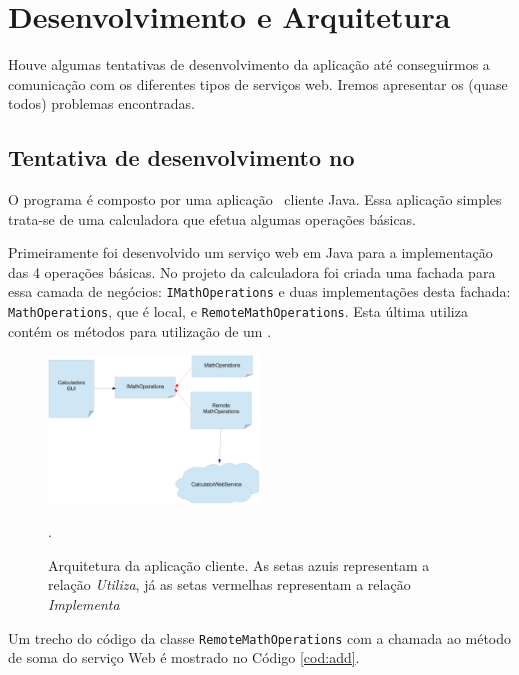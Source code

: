%

\chapter{Desenvolvimento e Arquitetura}

Houve algumas tentativas de desenvolvimento da aplicação até conseguirmos a
comunicação com os diferentes tipos de serviços web. Iremos apresentar os (quase
todos) problemas encontradas.

\section{Tentativa de desenvolvimento no \NetBeans}

O programa é composto por uma aplicação \desktop\ cliente Java. Essa aplicação
simples trata-se de uma calculadora que efetua algumas operações básicas. 

Primeiramente foi desenvolvido um serviço web em Java para a implementação das 4
operações básicas. No projeto da calculadora foi criada uma fachada para essa camada de negócios:
\texttt{IMathOperations} e duas implementações desta fachada:
\texttt{MathOperations}, que é local, e \texttt{RemoteMathOperations}. Esta
última utiliza contém os métodos para utilização de um \WebService.


\begin{figure}[htb]
  \centering
  \includegraphics[width=0.5\textwidth]{imgs/calculadora}
  \caption{Arquitetura da aplicação cliente. As setas azuis representam a
    relação \textit{Utiliza}, já as setas vermelhas representam a relação
  \textit{Implementa}}.
  \label{fig:arquitetura:calc}
\end{figure}

Um trecho do código da classe \texttt{RemoteMathOperations} com a chamada ao
método de soma do serviço Web é mostrado no Código \ref{cod:add}.

